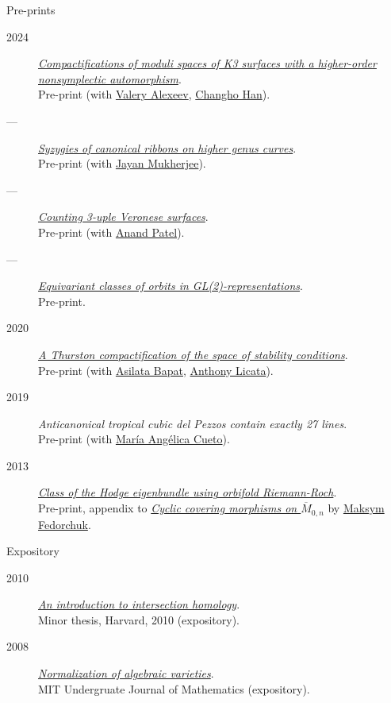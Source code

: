 \documentclass[11pt]{article}
\begin{document}
\begin{description}
\item[{Pre-prints}] 
\end{description}
\label{org798043d}
\begin{description}
\item[{2024}] \emph{\href{papers/k3z3.pdf}{Compactifications of moduli spaces of K3 surfaces with a higher-order nonsymplectic automorphism}}.\\
Pre-print (with \href{https://www.math.uga.edu/directory/people/valery-alexeev}{Valery Alexeev}, \href{https://sites.google.com/view/changho-han/}{Changho Han}).
\item[{---}] \emph{\href{papers/highergenusribbons.pdf}{Syzygies of canonical ribbons on higher genus curves}}.\\
Pre-print (with \href{https://sites.google.com/view/mukherjeejayan}{Jayan Mukherjee}).
\item[{---}] \emph{\href{papers/3veroneseP2.pdf}{Counting 3-uple Veronese surfaces}}.\\
Pre-print (with \href{https://sites.google.com/view/anand-patel}{Anand Patel}).
\item[{---}] \emph{\href{papers/gl2orbits.pdf}{Equivariant classes of orbits in GL(2)-representations}}.\\
Pre-print.
\item[{2020}] \emph{\href{papers/a2-compactification.pdf}{A Thurston compactification of the space of stability conditions}}.\\
Pre-print (with \href{https://asilata.org/}{Asilata Bapat}, \href{https://maths-people.anu.edu.au/\~licatat/}{Anthony Licata}).
\item[{2019}] \emph{Anticanonical tropical cubic del Pezzos contain exactly 27 lines}.\\
Pre-print (with \href{https://people.math.osu.edu/cueto.5/}{María Angélica Cueto}).
\item[{2013}] \emph{\href{papers/CyclicAppendix.pdf}{Class of the Hodge eigenbundle using orbifold Riemann-Roch}}.\\
Pre-print, appendix to \href{https://drive.google.com/file/d/1wq-Fh3DiqODc51t-J0phIexVF7B4lxsY/view}{\emph{Cyclic covering morphisms on \(\overline M_{0,n}\)}} by \href{https://www2.bc.edu/maksym-fedorchuk/}{Maksym Fedorchuk}.
\end{description}

\begin{description}
\item[{Expository}] 
\end{description}
\label{org82b88ba}
\begin{description}
\item[{2010}] \emph{\href{papers/anandrd\_minor\_thesis.pdf}{An introduction to intersection homology}}.\\
Minor thesis, Harvard, 2010 (expository).
\item[{2008}] \emph{\href{papers/anandrd\_ug\_thesis.pdf}{Normalization of algebraic varieties}}.\\
MIT Undergruate Journal of Mathematics (expository).
\end{description}
\end{document}
